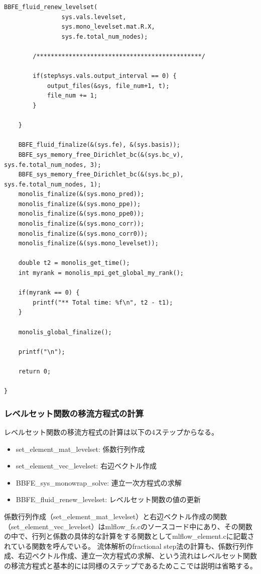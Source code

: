 \documentclass[8pt,a4paper]{article}
\begin{document}
\begin{lstlisting}[caption = mlflow\_fs.cのmain関数のレベルセット関数の計算部分抜粋]
		BBFE_fluid_renew_levelset(
				sys.vals.levelset, 
				sys.mono_levelset.mat.R.X,
				sys.fe.total_num_nodes);

		/**********************************************/

		if(step%sys.vals.output_interval == 0) {
			output_files(&sys, file_num+1, t);
			file_num += 1;
		}

	}

	BBFE_fluid_finalize(&(sys.fe), &(sys.basis));
	BBFE_sys_memory_free_Dirichlet_bc(&(sys.bc_v), sys.fe.total_num_nodes, 3);
	BBFE_sys_memory_free_Dirichlet_bc(&(sys.bc_p), sys.fe.total_num_nodes, 1);
	monolis_finalize(&(sys.mono_pred));
	monolis_finalize(&(sys.mono_ppe));
	monolis_finalize(&(sys.mono_ppe0));
	monolis_finalize(&(sys.mono_corr));
	monolis_finalize(&(sys.mono_corr0));
	monolis_finalize(&(sys.mono_levelset));

	double t2 = monolis_get_time();
	int myrank = monolis_mpi_get_global_my_rank();

	if(myrank == 0) {
		printf("** Total time: %f\n", t2 - t1);
	}

	monolis_global_finalize();

	printf("\n");

	return 0;

}
\end{lstlisting}

\subsubsection{レベルセット関数の移流方程式の計算}
レベルセット関数の移流方程式の計算は以下の4ステップからなる。
\begin{itemize}
	\item set\_element\_mat\_levelset: 係数行列作成
	\item set\_element\_vec\_levelset: 右辺ベクトル作成
	\item BBFE\_sys\_monowrap\_solve: 連立一次方程式の求解
	\item BBFE\_fluid\_renew\_levelset: レベルセット関数の値の更新
\end{itemize}
係数行列作成（set\_element\_mat\_levelset）と右辺ベクトル作成の関数（set\_element\_vec\_levelset）はmlflow\_fs.cのソースコード中にあり、その関数の中で、行列と係数の具体的な計算をする関数としてmlflow\_element.cに記載されている関数を呼んでいる。
流体解析のfractional step法の計算も、係数行列作成、右辺ベクトル作成、連立一次方程式の求解、という流れはレベルセット関数の移流方程式と基本的には同様のステップであるためここでは説明は省略する。
\end{document}
